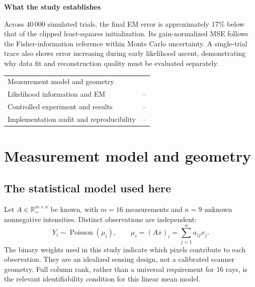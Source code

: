 \documentclass[11pt,a4paper]{article}
\newcommand{\R}{\mathbb R}
\newcommand{\Pois}{\operatorname{Poisson}}
\newcommand{\sectionpage}[2]{\clearpage\section{#1}\label{#2}}
\begin{document}
\vspace{5mm}
\begin{center}
\end{center}
\vspace{4mm}
\textbf{What the study establishes}\par
Across 40\,000 simulated trials, the final EM error is approximately 17\% below that of the clipped least-squares initialization. Its gain-normalized MSE follows the Fisher-information reference within Monte Carlo uncertainty. A single-trial trace also shows error increasing during early likelihood ascent, demonstrating why data fit and reconstruction quality must be evaluated separately.

\vfill
{\small\sffamily
\begin{tabularx}{\linewidth}{@{}Xr@{}}
Measurement model and geometry & \pageref{sec:model}\\
Likelihood information and EM & \pageref{sec:likelihood}--\pageref{sec:em}\\
Controlled experiment and results & \pageref{sec:study}--\pageref{sec:convergence}\\
Implementation audit and reproducibility & \pageref{sec:audit}--\pageref{sec:reproduce}
\end{tabularx}}

\sectionpage{Measurement model and geometry}{sec:model}
\subsection*{The statistical model used here}
Let $A\in\R_+^{m\times n}$ be known, with $m=16$ measurements and $n=9$ unknown nonnegative intensities. Distinct observations are independent:
\begin{equation}
 Y_i\sim\Pois(\mu_i),\qquad \mu_i=(Ax)_i=\sum_{j=1}^n a_{ij}x_j.
 \label{eq:model}
\end{equation}
The binary weights used in this study indicate which pixels contribute to each observation. They are an idealized sensing design, not a calibrated scanner geometry. Full column rank, rather than a universal requirement for 16 rays, is the relevant identifiability condition for this linear mean model.
\end{document}
